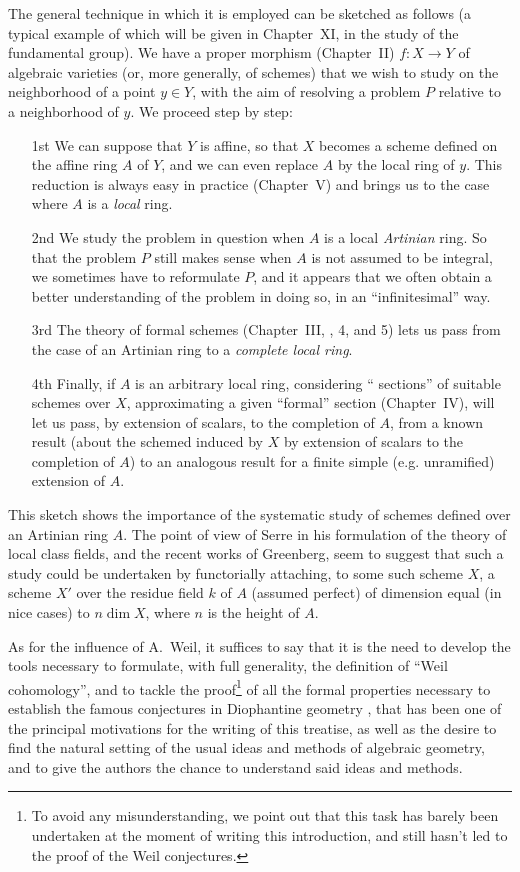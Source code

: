 The general technique in which it is employed can be sketched as follows (a typical example of which will be given in Chapter~XI, in the study of the fundamental group).
We have a proper morphism (Chapter~II) $f:X\to Y$ of algebraic varieties (or, more generally, of schemes) that we wish to study on the neighborhood of a point $y\in Y$, with the aim of resolving a problem $P$ relative to a neighborhood of $y$.
We proceed step by step:
\begin{enumerate}
  \item[1st]
    We can suppose that $Y$ is affine, so that $X$ becomes a scheme defined on the affine ring $A$ of $Y$, and we can even replace $A$ by the local ring of $y$.
    This reduction is always easy in practice (Chapter~V) and brings us to the case where $A$ is a \emph{local} ring.
  \item[2nd]
    We study the problem in question when $A$ is a local \emph{Artinian} ring.
    So that the problem $P$ still makes sense when $A$ is not assumed to be integral, we sometimes have to reformulate $P$, and it appears that we often obtain a better understanding of the problem in doing so, in an ``infinitesimal'' way.
  \item[3rd]
    The theory of formal schemes (Chapter~III, \textsection{}, 4, and 5) lets us pass from the case of an Artinian ring to a \emph{complete local ring}.
  \item[4th]
    Finally, if $A$ is an arbitrary local ring, considering `` sections'' of suitable schemes over $X$, approximating a given ``formal'' section (Chapter~IV), will let us pass,
by extension of scalars, to the completion of $A$, from a known result (about the schemed induced by $X$ by extension of scalars to the completion of $A$) to an analogous result for a finite simple (e.g. unramified) extension of $A$.
\end{enumerate}

This sketch shows the importance of the systematic study of schemes defined over an Artinian ring $A$.
The point of view of Serre in his formulation of the theory of local class fields, and the recent works of Greenberg, seem to suggest that such a study could be undertaken by functorially attaching, to some such scheme $X$, a scheme $X'$ over the residue field $k$ of $A$ (assumed perfect) of dimension equal (in nice cases) to $n\dim X$, where $n$ is the height of $A$.

As for the influence of A.~Weil, it suffices to say that it is the need to develop the tools necessary to formulate, with full generality, the definition of ``Weil cohomology'', and to tackle the proof\footnote{To avoid any misunderstanding, we point out that this task has barely been undertaken at the moment of writing this introduction, and still hasn't led to the proof of the Weil conjectures.} of all the formal properties necessary to establish the famous conjectures in Diophantine geometry \cite{I-19}, that has been one of the principal motivations for the writing of this treatise, as well as the desire to find the natural setting of the usual ideas and methods of algebraic geometry, and to give the authors the chance to understand said ideas and methods.

